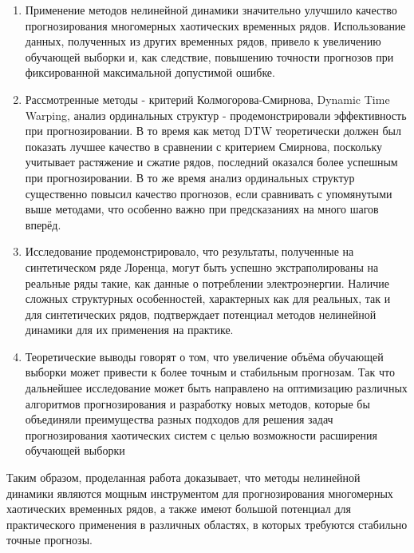 \documentclass[a4paper, 12pt]{extarticle}
\begin{document}
\begin{enumerate}
    \item Применение методов нелинейной динамики значительно улучшило качество прогнозирования многомерных хаотических временных рядов. Использование данных, полученных из других временных рядов, привело к увеличению обучающей выборки и, как следствие, повышению точности прогнозов при фиксированной максимальной допустимой ошибке.
    
    \item Рассмотренные методы - критерий Колмогорова-Смирнова, Dynamic Time Warping, анализ ординальных структур - продемонстрировали эффективность при прогнозировании. В то время как метод DTW теоретически должен был показать лучшее качество в сравнении с критерием Смирнова, поскольку учитывает растяжение и сжатие рядов, последний оказался более успешным при прогнозировании. В то же время анализ ординальных структур существенно повысил качество прогнозов, если сравнивать с упомянутыми выше методами, что особенно важно при предсказаниях на много шагов вперёд.
    
    \item Исследование продемонстрировало, что результаты, полученные на синтетическом ряде Лоренца, могут быть успешно экстраполированы на реальные ряды такие, как данные о потреблении электроэнергии. Наличие сложных структурных особенностей, характерных как для реальных, так и для синтетических рядов, подтверждает потенциал методов нелинейной динамики для их применения на практике.
    
    \item Теоретические выводы говорят о том, что увеличение объёма обучающей выборки может привести к более точным и стабильным прогнозам. Так что дальнейшее исследование может быть направлено на оптимизацию различных алгоритмов прогнозирования и разработку новых методов, которые бы объединяли преимущества разных подходов для решения задач прогнозирования хаотических систем с целью возможности расширения обучающей выборки
\end{enumerate}

Таким образом, проделанная работа доказывает, что методы нелинейной динамики являются мощным инструментом для прогнозирования многомерных хаотических временных рядов, а также имеют большой потенциал для практического применения в различных областях, в которых требуются стабильно точные прогнозы.

\newpage


\end{document}
